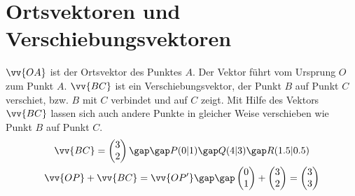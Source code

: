 \section{Ortsvektoren und Verschiebungsvektoren}
$\vv{OA}$ ist der Ortsvektor des Punktes $A$. Der Vektor führt vom Ursprung $O$ zum Punkt $A$. $\vv{BC}$ ist ein Verschiebungsvektor, der Punkt $B$ auf Punkt $C$ verschiet, bzw. $B$ mit $C$ verbindet und auf $C$ zeigt. Mit Hilfe des Vektors $\vv{BC}$ lassen sich auch andere Punkte in gleicher Weise verschieben wie Punkt $B$ auf Punkt $C$.
\begin{gather*}
  \vv{BC} = \begin{pmatrix} 3 \\ 2 \end{pmatrix} \gap\gap P(0|1) \gap Q(4|3) \gap R(1.5|0.5) \\
  \vv{OP} + \vv{BC} = \vv{OP'} \gap\gap \begin{pmatrix} 0 \\ 1 \end{pmatrix} + \begin{pmatrix} 3 \\ 2 \end{pmatrix} = \begin{pmatrix} 3 \\ 3 \end{pmatrix}
\end{gather*}
